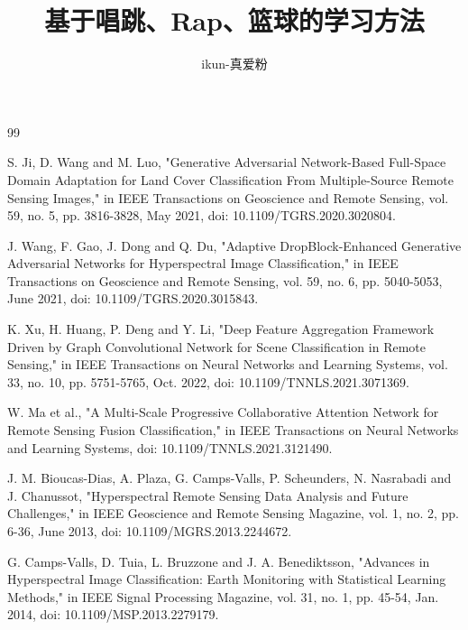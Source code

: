 \documentclass[UTF8,zihao=-4]{oucart}
\title{基于唱跳、Rap、篮球的学习方法}
\author{ikun-真爱粉}
\begin{document}
\makecover %

\makesignature %

\makeabstract %

\thispagestyle{tableofcontents}
\tableofcontents
\newpage

\setcounter{page}{1}



\newpage

\newpage

\begin{thebibliography}{99}

    S. Ji, D. Wang and M. Luo, "Generative Adversarial Network-Based Full-Space Domain Adaptation for Land Cover Classification From Multiple-Source Remote Sensing Images," in IEEE Transactions on Geoscience and Remote Sensing, vol. 59, no. 5, pp. 3816-3828, May 2021, doi: 10.1109/TGRS.2020.3020804.

    J. Wang, F. Gao, J. Dong and Q. Du, "Adaptive DropBlock-Enhanced Generative Adversarial Networks for Hyperspectral Image Classification," in IEEE Transactions on Geoscience and Remote Sensing, vol. 59, no. 6, pp. 5040-5053, June 2021, doi: 10.1109/TGRS.2020.3015843.

    K. Xu, H. Huang, P. Deng and Y. Li, "Deep Feature Aggregation Framework Driven by Graph Convolutional Network for Scene Classification in Remote Sensing," in IEEE Transactions on Neural Networks and Learning Systems, vol. 33, no. 10, pp. 5751-5765, Oct. 2022, doi: 10.1109/TNNLS.2021.3071369.

    W. Ma et al., "A Multi-Scale Progressive Collaborative Attention Network for Remote Sensing Fusion Classification," in IEEE Transactions on Neural Networks and Learning Systems, doi: 10.1109/TNNLS.2021.3121490.

    J. M. Bioucas-Dias, A. Plaza, G. Camps-Valls, P. Scheunders, N. Nasrabadi and J. Chanussot, "Hyperspectral Remote Sensing Data Analysis and Future Challenges," in IEEE Geoscience and Remote Sensing Magazine, vol. 1, no. 2, pp. 6-36, June 2013, doi: 10.1109/MGRS.2013.2244672.

    G. Camps-Valls, D. Tuia, L. Bruzzone and J. A. Benediktsson, "Advances in Hyperspectral Image Classification: Earth Monitoring with Statistical Learning Methods," in IEEE Signal Processing Magazine, vol. 31, no. 1, pp. 45-54, Jan. 2014, doi: 10.1109/MSP.2013.2279179.


\end{thebibliography}
\end{document}
